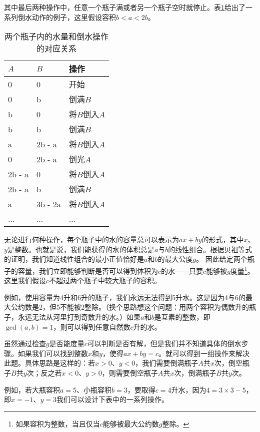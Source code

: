 \documentclass[UTF8]{article}
\begin{document}
其中最后两种操作中，任意一个瓶子满或者另一个瓶子空时就停止。表\ref{tab:jug-ops}给出了一系列倒水动作的例子，这里假设容积$b < a < 2b$。

\begin{table}[htbp]
\centering
\begin{tabular}{l|l|l}
$A$ & $B$ & 操作 \\
\hline
0 & 0 & 开始 \\
0 & b & 倒满$B$ \\
b & 0 & 将$B$倒入$A$ \\
b & b & 倒满$B$ \\
a & 2b - a & 将$B$倒入$A$ \\
0 & 2b - a & 倒光$A$ \\
2b - a & 0 & 将$B$倒入$A$ \\
2b - a & b & 倒满$B$ \\
a & 3b - 2a & 将$B$倒入$A$ \\
... & ... & ... \\
\end{tabular}
\caption{两个瓶子内的水量和倒水操作的对应关系} \label{tab:jug-ops}
\end{table}

无论进行何种操作，每个瓶子中的水的容量总可以表示为$ax + by$的形式，其中$x$、$y$是整数。也就是说，我们能获得的水的体积总是$a$与$b$的线性组合。根据贝祖等式的证明，我们知道线性组合的最小正值恰好是$a$和$b$的最大公度$g$。
因此给定两个瓶子的容量，我们立即能够判断是否可以得到体积为$c$的水——只要$c$能够被$g$度量\footnote{如果容积为整数，当且仅当$c$能够被最大公约数$g$整除。}。这里我们假设$c$不超过两个瓶子中较大瓶子的容积。

例如，使用容量为4升和6升的瓶子，我们永远无法得到5升水。这是因为4与6的最大公约数是2，但5不能被2整除。（换个思路想这个问题：用两个容积为偶数升的瓶子，永远无法从河里打到奇数升的水。）如果$a$和$b$是互素的整数，即$\gcd(a, b) = 1$，则可以得到任意自然数$c$升的水。

虽然通过检查$g$是否能度量$c$可以判断是否有解，但是我们并不知道具体的倒水步骤。如果我们可以找到整数$x$和$y$，使得$ax + by = c$。就可以得到一组操作来解决此题。具体思路是这样的：若$x > 0$、$y < 0$，我们需要倒满瓶子$A$共$x$次，倒空瓶子$B$共$y$次；反之若$x < 0$、$y > 0$，则需要倒空瓶子$A$共$x$次，倒满瓶子$B$共$y$次。

例如，若大瓶容积$a=5$、小瓶容积$b=3$，要取得$c=4$升水，因为$4 = 3 \times 3 - 5$，即$x = -1$、$y = 3$我们可以设计下表中的一系列操作。
\end{document}
